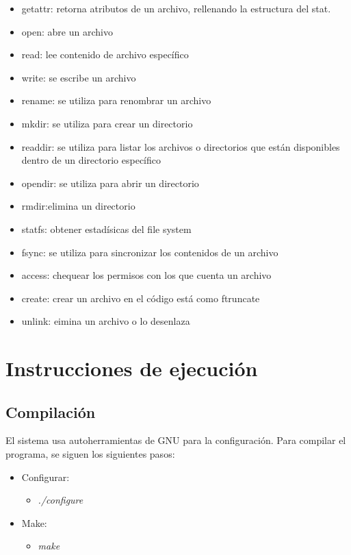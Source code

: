 \documentclass{article}
\begin{document}
\begin{itemize}
  \item getattr: retorna atributos de un archivo, rellenando la estructura del stat. 
  \item open: abre un archivo 
  \item read: lee contenido de archivo específico 
  \item write: se escribe un archivo 
  \item rename: se utiliza para renombrar un archivo 
  \item mkdir: se utiliza para crear un directorio 
  \item readdir: se utiliza para listar los archivos o directorios que están disponibles dentro de un directorio específico 
  \item opendir: se utiliza para abrir un directorio 
  \item rmdir:elimina un directorio 
  \item statfs: obtener estadísicas del file system 
  \item fsync: se utiliza para sincronizar los contenidos de un archivo 
  \item access: chequear los permisos con los que cuenta un archivo 
  \item create: crear un archivo en el código está como ftruncate 
  \item unlink: eimina un archivo o lo desenlaza 
\end{itemize}

\section{Instrucciones de ejecuci\'on}
\subsection{Compilaci\'on}
El sistema usa autoherramientas de GNU para la configuraci\'on. Para compilar el programa, se siguen los siguientes pasos:
\begin{itemize}
  \item Configurar:
  \begin{itemize}
    \item \emph{./configure}
  \end{itemize}
  \item Make:
  \begin{itemize}
    \item \emph{make}
  \end{itemize}
\end{itemize}
\end{document}
